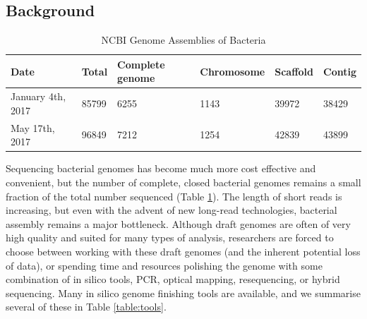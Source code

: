 \documentclass[11pt]{article}
\begin{document}
\begin{linenumbers}


\section*{Background}
\begin{table}[]
\centering
\caption{NCBI Genome Assemblies of Bacteria}
\label{table:completions}
\begin{tabular}{llllll}
  Date              & Total & Complete genome & Chromosome & Scaffold & Contig \\
  \hline
January 4th, 2017 & 85799 & 6255            & 1143       & 39972    & 38429  \\
May 17th, 2017    & 96849 & 7212            & 1254       & 42839    & 43899

\end{tabular}
\end{table}

Sequencing bacterial genomes has become much more cost effective and convenient, but the number of complete, closed bacterial genomes remains a small fraction of the total number sequenced (Table \ref{table:completions}). The length of short reads is increasing, but even with the advent of new long-read technologies, bacterial assembly remains a major bottleneck\cite{Nagarajan2010,Brouwer2016}. Although draft genomes are often of very high quality and suited for many types of analysis, researchers are forced to choose between working with these draft genomes (and the inherent potential loss of data), or spending time and resources polishing the genome with some combination of in silico tools, PCR, optical mapping, resequencing, or hybrid sequencing\cite{Nagarajan2010}. Many in silico genome finishing tools are available, and we summarise several of these in Table \ref{table:tools}.





\end{linenumbers}
\end{document}
